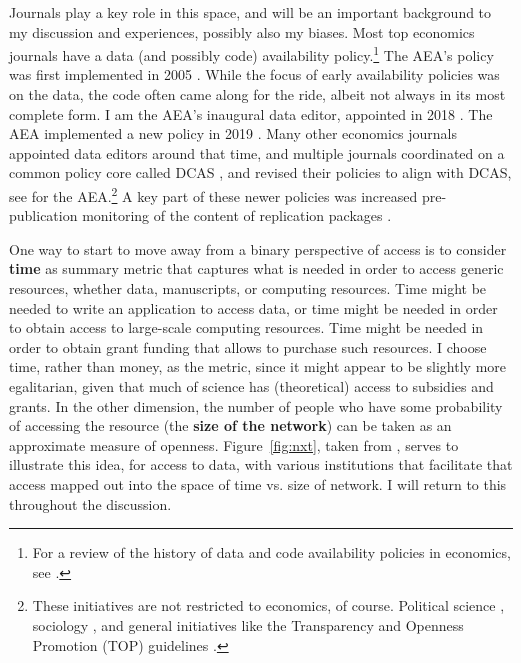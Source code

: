 \documentclass{article}
\begin{document}
Journals play a key role in this space, and will be an important background to my discussion and experiences, possibly also my biases. Most top economics journals have a data (and possibly code) availability policy.\footnote{For a review of the history of data and code availability policies in economics, see \citet{vlaeminck_dawning_2021}.} The AEA's policy was first implemented in 2005 \citep{bernanke_editorial_2004,american_economic_association_data_2005}. While the focus of early availability policies was on the data, the code often came along for the ride, albeit not always in its most complete form. I am the \ac{AEA}'s inaugural data editor, appointed in 2018 \citep{10.1257/pandp.108.745}. The AEA implemented a new policy in 2019 \citep{AEA-announcement-July-2019,AEA-announcement-July-2019}. Many other economics journals appointed data editors around that time, and  multiple journals coordinated on a common policy core called  \ac{DCAS} \citep{koren_data_2022}, and revised their policies to align with \ac{DCAS}, see \citet{american_economic_association_data_2024} for the AEA.\footnote{These initiatives are not restricted to economics, of course. Political science \citep{noauthor_data_2014,jacoby_american_2015,basile_research_2023}, sociology \citep{sociological_science_manuscript_2018,weeden_crisis_2023}, and general initiatives like the Transparency and Openness Promotion (TOP) guidelines \citep{nosek_promoting_2015}.} A key part of these newer policies was increased pre-publication monitoring of the content of replication packages \citep{10.1257/pandp.108.745,ChristianInt.J.Digit.Curation2018}.


One way to start to move away from a binary perspective of access is to consider \textbf{time} as summary metric that captures what is needed in order to access generic resources, whether data, manuscripts, or computing resources. Time might be needed to write an application to access data, or time might be needed in order to obtain access to large-scale computing resources. Time might be needed in order to obtain grant funding that allows to purchase such resources. I choose time, rather than money, as the metric, since it might appear to be slightly more egalitarian, given that much of science has (theoretical) access to subsidies and grants. In the other dimension,  the number of people who have some probability of accessing the resource (the \textbf{size of the network}) can be taken as an approximate measure of openness. Figure~\ref{fig:nxt}, taken from \citet{vilhuber_reproducibility_2023}, serves to illustrate this idea, for access to data, with various institutions that facilitate that access mapped out into the space of time vs. size of network. I will return to this throughout the discussion.
\end{document}

